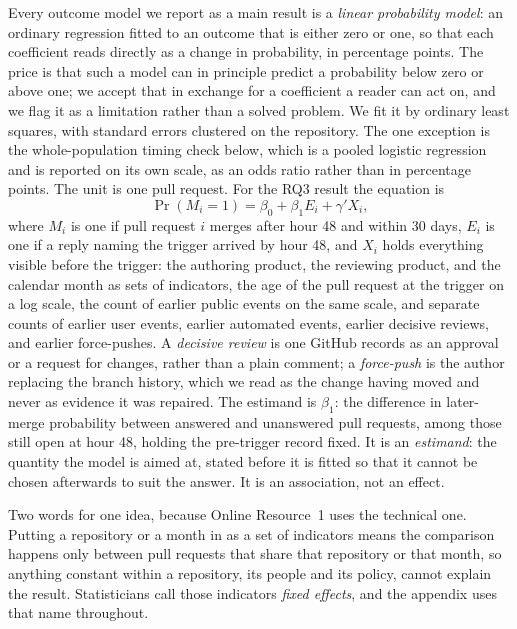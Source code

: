 \documentclass[lineno,pdflatex,sn-basic]{sn-jnl}
\begin{document}
Every outcome model we report as a main result is a \emph{linear probability
model}: an ordinary regression fitted to an outcome that is either zero or one,
so that each coefficient reads directly as a change in probability, in percentage
points. The price is that such a model can in principle predict a probability
below zero or above one; we accept that in exchange for a coefficient a reader
can act on, and we flag it as a limitation rather than a solved problem. We fit
it by ordinary least squares, with standard errors clustered
on the repository. The one exception is the whole-population timing check below,
which is a pooled logistic regression and is reported on its own scale, as an
odds ratio rather than in percentage points. The unit is one pull request. For the RQ3 result the equation is
\begin{equation}
\label{eq:rq3}
\Pr(M_i = 1) = \beta_0 + \beta_1 E_i + \gamma' X_i,
\end{equation}
where $M_i$ is one if pull request $i$ merges after hour 48 and within 30 days,
$E_i$ is one if a reply naming the trigger arrived by hour 48, and $X_i$ holds
everything visible before the trigger: the authoring product, the reviewing
product, and the calendar month as sets of indicators, the age of the pull
request at the trigger on a log scale, the count of earlier public events on the
same scale, and separate counts of earlier user events, earlier automated events,
earlier decisive reviews, and earlier force-pushes. A \emph{decisive review} is
one GitHub records as an approval or a request for changes, rather than a plain
comment; a \emph{force-push} is the author replacing the branch history, which we
read as the change having moved and never as evidence it was repaired. The estimand is $\beta_1$: the
difference in later-merge probability between answered and unanswered pull
requests, among those still open at hour 48, holding the pre-trigger record fixed.
It is an \emph{estimand}: the quantity the model is aimed at, stated before it is
fitted so that it cannot be chosen afterwards to suit the answer. It is an
association, not an effect.

Two words for one idea, because Online Resource~1 uses the technical one. Putting
a repository or a month in as a set of indicators means the comparison happens
only between pull requests that share that repository or that month, so anything
constant within a repository, its people and its policy, cannot explain the
result. Statisticians call those indicators \emph{fixed effects}, and the
appendix uses that name throughout.
\end{document}
